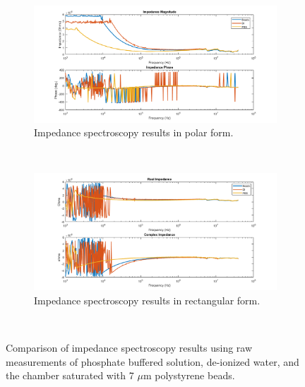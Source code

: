 \begin{figure}[h]
    \centering
    \begin{subfigure}[b]{\textwidth}
        \centering
        \includegraphics[width=\textwidth]{images/raw_IS_data_mag_phase.png}
        \caption{Impedance spectroscopy results in polar form.}
    \end{subfigure}
    \\
    \vspace{0.1 in}
    \begin{subfigure}[b]{\textwidth}
        \centering
        \includegraphics[width=\textwidth]{images/raw_IS_data_real_imag.png}
        \caption{Impedance spectroscopy results in rectangular form.}
    \end{subfigure}
    \\
    \caption[PBS, DI, microbead IS Raw data comparison.]{Comparison of impedance spectroscopy results using raw measurements of phosphate buffered solution, de-ionized water, and the chamber saturated with 7 $\mu$m polystyrene beads.}
    \label{fig:IS_data_beads_pbs_DI_comp}
\end{figure}

